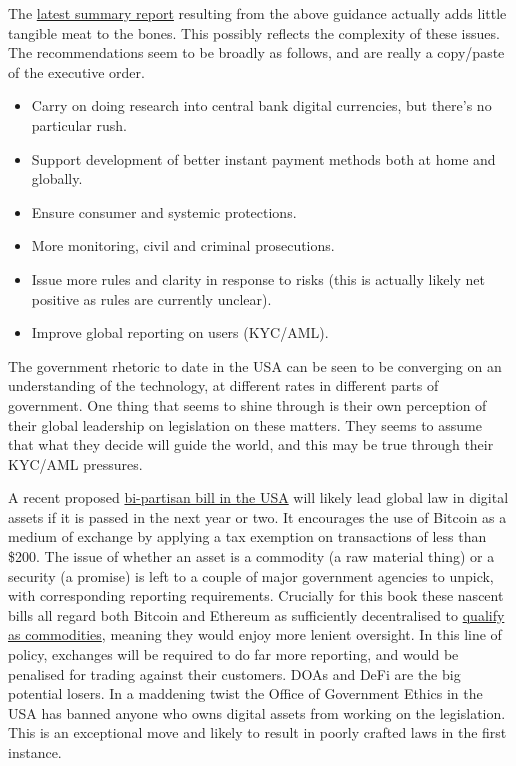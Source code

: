The \href{https://www.whitehouse.gov/briefing-room/statements-releases/2022/09/16/fact-sheet-white-house-releases-first-ever-comprehensive-framework-for-responsible-development-of-digital-assets/}{latest summary report} resulting from the above guidance actually adds little tangible meat to the bones. This possibly reflects the complexity of these issues. The recommendations seem to be broadly as follows, and are really a copy/paste of the executive order.
\begin{itemize}
\item Carry on doing research into central bank digital currencies, but there's no particular rush.
\item Support development of better instant payment methods both at home and globally. 
\item Ensure consumer and systemic protections.
\item More monitoring, civil and criminal prosecutions.
\item Issue more rules and clarity in response to risks (this is actually likely net positive as rules are currently unclear).
\item Improve global reporting on users (KYC/AML).
\end{itemize}
The government rhetoric to date in the USA can be seen to be converging on an understanding of the technology, at different rates in different parts of government. One thing that seems to shine through is their own perception of their global leadership on legislation on these matters. They seems to assume that what they decide will guide the world, and this may be true through their KYC/AML pressures.\par
A recent proposed \href{https://bitcoinmagazine.com/business/heres-whats-in-senator-lummis-bitcoin-bill}{bi-partisan bill in the USA} will likely lead global law in digital assets if it is passed in the next year or two. It encourages the use of Bitcoin as a medium of exchange by applying a tax exemption on transactions of less than \$200. The issue of whether an asset is a commodity (a raw material thing) or a security (a promise) is left to a couple of major government agencies to unpick, with corresponding reporting requirements. Crucially for this book these nascent bills all regard both Bitcoin and Ethereum as sufficiently decentralised to \href{https://www.coincenter.org/a-new-senate-bill-focuses-on-cryptocurrency-exchanges-heres-what-developers-and-users-should-keep-an-eye-on/}{qualify as commodities}, meaning they would enjoy more lenient oversight. In this line of policy, exchanges will be required to do far more reporting, and would be penalised for trading against their customers. DOAs and DeFi are the big potential losers. In a maddening twist the Office of Government Ethics in the USA has banned anyone who owns digital assets from working on the legislation. This is an exceptional move and likely to result in poorly crafted laws in the first instance.\par
